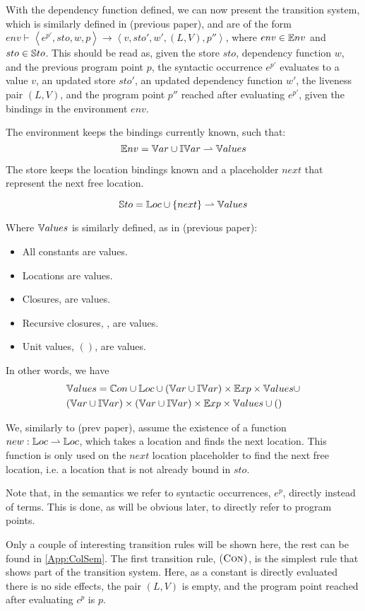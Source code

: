 \documentclass[../../master.tex]{subfiles}
\begin{document}
With the dependency function defined, we can now present the transition system, which is similarly defined in (previous paper), and are of the form $env\vdash\left\langle e^{p'},sto,w,p\right\rangle\rightarrow\left\langle v,sto',w',(L,V),p''\right\rangle$, where $env\in\mathbb{E}nv$ and $sto\in\mathbb{S}to$.
This should be read as, given the store $sto$, dependency function $w$, and the previous program point $p$, the syntactic occurrence $e^{p'}$ evaluates to a value $v$, an updated store $sto'$, an updated dependency function $w'$, the liveness pair $(L,V)$, and the program point $p''$ reached after evaluating $e^{p'}$, given the bindings in the environment $env$.

The environment keeps the bindings currently known, such that:
$$\mathbb{E}nv=\mathbb{V}ar\cup\mathbb{IV}ar\rightharpoonup\mathbb{V}alues$$

The store keeps the location bindings known and a placeholder $next$ that represent the next free location.

$$\mathbb{S}to=\mathbb{L}oc\cup\{next\}\rightharpoonup\mathbb{V}alues$$

Where $\mathbb{V}alues$ is similarly defined, as in (previous paper):
\begin{itemize}
	\item All constants are values.
	\item Locations are values.
	\item Closures,  are values.
	\item Recursive closures, , are values.
	\item Unit values, $()$, are values.
\end{itemize}
In other words, we have
\begin{align*}
	&\mathbb{V}alues=\mathbb{C}on\cup\mathbb{L}oc\cup(\mathbb{V}ar\cup\mathbb{IV}ar)\times\mathbb{E}xp\times\mathbb{V}alues\cup\\
	&(\mathbb{V}ar\cup\mathbb{IV}ar)\times(\mathbb{V}ar\cup\mathbb{IV}ar)\times\mathbb{E}xp\times\mathbb{V}alues\cup()
\end{align*}

We, similarly to (prev paper), assume the existence of a function $new:\mathbb{L}oc\rightharpoonup\mathbb{L}oc$, which takes a location and finds the next location.
This function is only used on the $next$ location placeholder to find the next free location, i.e. a location that is not already bound in $sto$.

Note that, in the semantics we refer to syntactic occurrences, $e^p$, directly instead of terms.
This is done, as will be obvious later, to directly refer to program points.
\bigskip

Only a couple of interesting transition rules will be shown here, the rest can be found in \cref{App:ColSem}.
The first transition rule, $\textsc{(Con)}$, is the simplest rule that shows part of the transition system.
Here, as a constant is directly evaluated there is no side effects, the pair $(L,V)$ is empty, and the program point reached after evaluating $c^p$ is $p$.
\end{document}
